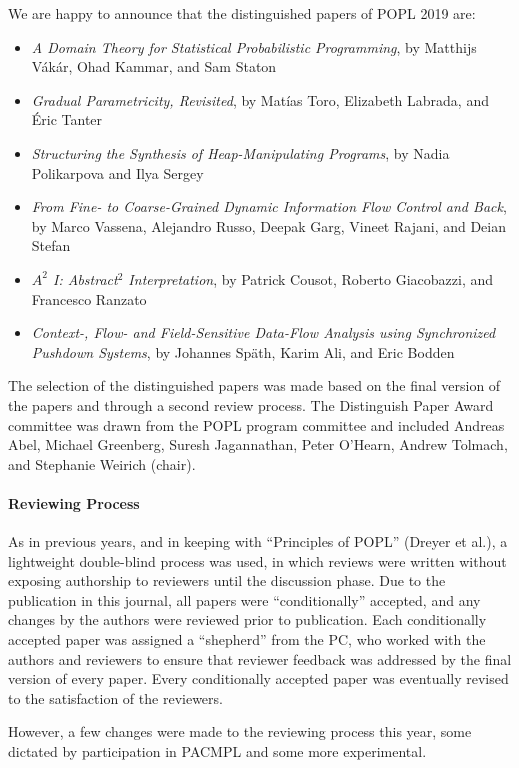 We are happy to announce that the distinguished papers of POPL 2019 are:

\begin{itemize}
\item {\em A Domain Theory for Statistical Probabilistic Programming}, by 
Matthijs Vákár, Ohad Kammar, and Sam Staton
\item {\em Gradual Parametricity, Revisited}, by
Matías Toro, Elizabeth Labrada, and Éric Tanter
\item {\em Structuring the Synthesis of Heap-Manipulating Programs}, by 
Nadia Polikarpova and Ilya Sergey
\item {\em From Fine- to Coarse-Grained Dynamic Information Flow Control and
    Back}, by
Marco Vassena, Alejandro Russo, Deepak Garg, Vineet Rajani, and Deian Stefan
\item {\em $A^2$ I: Abstract$^2$ Interpretation}, by 
Patrick Cousot, Roberto Giacobazzi, and Francesco Ranzato
\item {\em Context-, Flow- and Field-Sensitive Data-Flow Analysis using
  Synchronized Pushdown Systems}, by
Johannes Späth, Karim Ali, and Eric Bodden
\end{itemize}

The selection of the distinguished papers was made based on the final version
of the papers and through a second review process. The Distinguish Paper Award
committee was drawn from the POPL program committee and included Andreas Abel,
Michael Greenberg, Suresh Jagannathan, Peter O'Hearn, Andrew Tolmach, and
Stephanie Weirich (chair).

\paragraph{Reviewing Process}
%
As in previous years, and in keeping with ``Principles of POPL'' (Dreyer et
al.), a lightweight double-blind process was used, in which reviews were
written without exposing authorship to reviewers until the discussion phase.
%
Due to the publication in this journal, all papers were
``conditionally'' accepted, and any changes by the authors were reviewed prior
to publication. Each conditionally accepted paper
was assigned a ``shepherd'' from the PC, who worked with the authors
and reviewers to ensure that reviewer feedback was addressed by the
final version of every paper. Every conditionally accepted paper was
eventually revised to the satisfaction of the reviewers.

%
However, a few changes were made to the reviewing process this year,
some dictated by participation in PACMPL and some more experimental.
%

